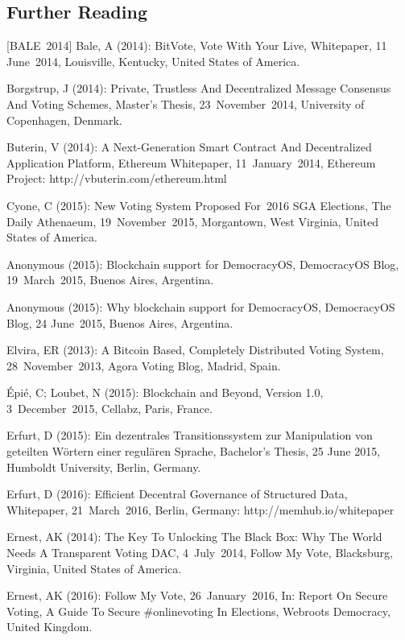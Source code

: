 \documentclass[9pt,oneside]{amsart}
\begin{document}
\begin{multicols}{2}
\section{Further Reading}
[BALE~2014] Bale, A (2014): BitVote, Vote With Your Live, Whitepaper, 11 June~2014, Louisville, Kentucky, United States of America.\par
[BORGSTRUP~2014] Borgstrup, J (2014): Private, Trustless And Decentralized Message Consensus And Voting Schemes, Master's Thesis, 23~November~2014, University of Copenhagen, Denmark.\par
[BUTERIN~2014] Buterin, V (2014): A Next-Generation Smart Contract And Decentralized Application Platform, Ethereum Whitepaper, 11~January~2014, Ethereum Project: http://vbuterin.com/ethereum.html\par
[COYNE~2015] Cyone, C (2015): New Voting System Proposed For~2016 SGA Elections, The Daily Athenaeum, 19~November~2015, Morgantown, West Virginia, United States of America.\par
[DEMOCRACYOS~2015A] Anonymous (2015): Blockchain support for DemocracyOS, DemocracyOS Blog, 19~March~2015, Buenos Aires, Argentina.\par
[DEMOCRACYOS~2015B] Anonymous (2015): Why blockchain support for DemocracyOS, DemocracyOS Blog, 24 June~2015, Buenos Aires, Argentina.\par
[ELVIRA~2013] Elvira, ER (2013): A Bitcoin Based, Completely Distributed Voting System, 28~November~2013, Agora Voting Blog, Madrid, Spain.\par
[ÉPIÉ~et~al.~2015] Épié, C; Loubet, N (2015): Blockchain and Beyond, Version 1.0, 3~December~2015, Cellabz, Paris, France.\par
[ERFURT~2015] Erfurt, D (2015): Ein dezentrales Transitionssystem zur Manipulation von geteilten Wörtern einer regulären Sprache, Bachelor's Thesis, 25 June 2015, Humboldt University, Berlin, Germany.\par
[ERFURT~2016] Erfurt, D (2016): Efficient Decentral Governance of Structured Data, Whitepaper, 21~March~2016, Berlin, Germany: http://memhub.io/whitepaper\par
[ERNEST~2014] Ernest, AK (2014): The Key To Unlocking The Black Box: Why The World Needs A Transparent Voting DAC, 4~July~2014, Follow My Vote, Blacksburg, Virginia, United States of America.\par
[ERNEST~2016] Ernest, AK (2016): Follow My Vote, 26~January~2016, In: Report On Secure Voting, A Guide To Secure \#onlinevoting In Elections, Webroots Democracy, United Kingdom.\par

\end{multicols}
\end{document}
